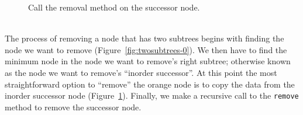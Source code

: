 \begin{minipage}{0.3\textwidth}
    \centering
    \begin{figure}[H]
    \caption{Call the removal method on the successor node.}
    \label{fig:twosubtrees-2}
    \end{figure}
\end{minipage}
\vspace{0.25cm}\\

The process of removing a node that has two subtrees begins with finding the
node we want to remove (Figure~\ref{fig:twosubtrees-0}). We then have to find
the minimum node in the node we want to remove's right subtree; otherwise known
as the node we want to remove's ``inorder successor''. At this point the most
straightforward option to ``remove'' the orange node is to copy the data from
the inorder successor node (Figure~\ref{fig:twosubtrees-2}). Finally, we make
a recursive call to the \lstinline|remove| method to remove the successor
node.
